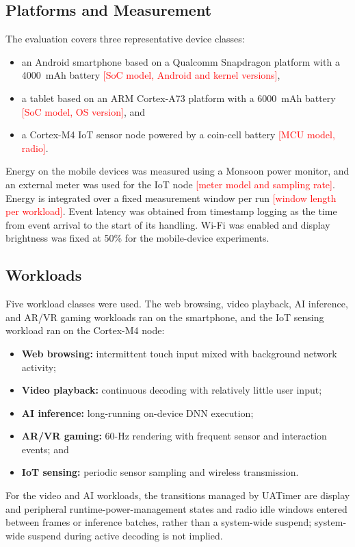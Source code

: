 \documentclass[journal]{IEEEtran}
\newcommand{\authorcheck}[1]{\textcolor{red}{[#1]}}
\begin{document}
\subsection{Platforms and Measurement}
The evaluation covers three representative device classes:
\begin{itemize}
    \item an Android smartphone based on a Qualcomm Snapdragon platform with a 4000~mAh battery \authorcheck{SoC model, Android and kernel versions},
    \item a tablet based on an ARM Cortex-A73 platform with a 6000~mAh battery \authorcheck{SoC model, OS version}, and
    \item a Cortex-M4 IoT sensor node powered by a coin-cell battery \authorcheck{MCU model, radio}.
\end{itemize}
Energy on the mobile devices was measured using a Monsoon power monitor, and an external meter was used for the IoT node \authorcheck{meter model and sampling rate}. Energy is integrated over a fixed measurement window per run \authorcheck{window length per workload}. Event latency was obtained from timestamp logging as the time from event arrival to the start of its handling. Wi-Fi was enabled and display brightness was fixed at 50\% for the mobile-device experiments.

\subsection{Workloads}
Five workload classes were used. The web browsing, video playback, AI inference, and AR/VR gaming workloads ran on the smartphone, and the IoT sensing workload ran on the Cortex-M4 node:
\begin{itemize}
    \item \textbf{Web browsing:} intermittent touch input mixed with background network activity;
    \item \textbf{Video playback:} continuous decoding with relatively little user input;
    \item \textbf{AI inference:} long-running on-device DNN execution;
    \item \textbf{AR/VR gaming:} 60-Hz rendering with frequent sensor and interaction events; and
    \item \textbf{IoT sensing:} periodic sensor sampling and wireless transmission.
\end{itemize}
For the video and AI workloads, the transitions managed by UATimer are display and peripheral runtime-power-management states and radio idle windows entered between frames or inference batches, rather than a system-wide suspend; system-wide suspend during active decoding is not implied.
\end{document}
